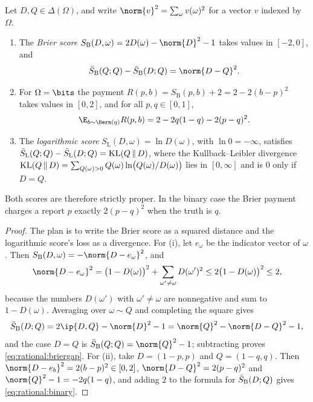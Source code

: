 \begin{refsection}
\begin{theorem}\label{thm:rational:brier}
Let $D,Q\in\Delta(\Omega)$, and write $\norm{v}^2=\sum_\omega v(\omega)^2$ for a vector $v$ indexed by $\Omega$.
\begin{enumerate}
\item The \emph{Brier score} $S_{\mathrm B}(D,\omega)=2D(\omega)-\norm{D}^2-1$ takes values in $[-2,0]$, and
\begin{equation}\label{eq:rational:briergap}
\rationalS_{\mathrm B}(Q;Q)-\rationalS_{\mathrm B}(D;Q)=\norm{D-Q}^2 .
\end{equation}
\item For $\Omega=\bits$ the payment $R(p,b)=S_{\mathrm B}(p,b)+2=2-2(b-p)^2$ takes values in $[0,2]$, and for all $p,q\in[0,1]$,
\begin{equation}\label{eq:rational:binary}
\E_{b\sim\Bern(q)}R(p,b)=2-2q(1-q)-2(p-q)^2 .
\end{equation}
\item The \emph{logarithmic score} $S_{\mathrm L}(D,\omega)=\ln D(\omega)$, with $\ln0=-\infty$, satisfies $\bar S_{\mathrm L}(Q;Q)-\bar S_{\mathrm L}(D;Q)=\mathrm{KL}(Q\,\|\,D)$, where the Kullback--Leibler divergence $\mathrm{KL}(Q\,\|\,D)=\sum_{Q(\omega)>0}Q(\omega)\ln\bigl(Q(\omega)/D(\omega)\bigr)$ lies in $[0,\infty]$ and is $0$ only if $D=Q$.
\end{enumerate}
Both scores are therefore strictly proper. In the binary case the Brier payment charges a report $p$ exactly $2(p-q)^2$ when the truth is $q$.
\end{theorem}

\begin{proof}
The plan is to write the Brier score as a squared distance and the logarithmic score's loss as a divergence. For (i), let $e_\omega$ be the indicator vector of $\omega$. Then $S_{\mathrm B}(D,\omega)=-\norm{D-e_\omega}^2$, and
\[
\norm{D-e_\omega}^2=\bigl(1-D(\omega)\bigr)^2+\sum_{\omega'\ne\omega}D(\omega')^2\le2\bigl(1-D(\omega)\bigr)^2\le2,
\]
because the numbers $D(\omega')$ with $\omega'\ne\omega$ are nonnegative and sum to $1-D(\omega)$. Averaging over $\omega\sim Q$ and completing the square gives
\[
\rationalS_{\mathrm B}(D;Q)=2\ip{D,Q}-\norm{D}^2-1=\norm{Q}^2-\norm{D-Q}^2-1,
\]
and the case $D=Q$ is $\rationalS_{\mathrm B}(Q;Q)=\norm{Q}^2-1$; subtracting proves \eqref{eq:rational:briergap}. For (ii), take $D=(1-p,p)$ and $Q=(1-q,q)$. Then $\norm{D-e_b}^2=2(b-p)^2\in[0,2]$, $\norm{D-Q}^2=2(p-q)^2$ and $\norm{Q}^2-1=-2q(1-q)$, and adding $2$ to the formula for $\bar S_{\mathrm B}(D;Q)$ gives \eqref{eq:rational:binary}.


\end{proof}
\end{refsection}
